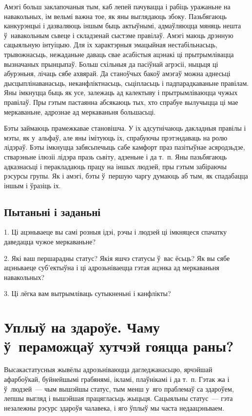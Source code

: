 Амэгі больш заклапочаныя тым, каб лепей пачувацца і рабіць уражаньне на навакольных, ім вельмі важна тое, як яны выглядаюць збоку. Пазьбягаюць канкурэнцыі і дазваляюць іншым быць актыўнымі, адмаўляюцца мяняць нешта ў~навакольным сьвеце і складзенай сыстэме правілаў. Амэгі маюць дрэнную сацыяльную інтуіцыю. Для іх характэрныя эмацыйная нестабільнасьць, трывожнасьць, нежаданьне даваць свае асабістыя ацэнакі ці прытрымлівацца вызначаных прынцыпаў. Больш схільныя да пасіўнай агрэсіі, ныцьця ці абурэньня, лічаць сябе ахвярай. Да станоўчых бакоў амэгаў можна аднесьці дысцыплінаванасьць, неканфліктнасьць, сьціпласьць і падпарадкаваньне правілам. Яны імкнуцца быць як усе, залежаць ад калектыву і прытрымліваюцца чужых правілаў. Пры гэтым пастаянна абсякаюць тых, хто спрабуе вылучыцца ці мае меркаваньне, адрознае ад меркаваньня большасьці.

Бэты займаюць прамежкавае становішча. У іх адсутнічаюць дакладныя правілы і мэты, як у~альфаў, але яны імітуюць іх, спрабуючы прэтэндаваць на ролю лідэраў. Бэты імкнуцца забясьпечыць сабе камфорт праз пазітыўнае асяродзьдзе, стварэньне ілюзіі лідэра празь сьвіту, адзеньне і да т.~п. Яны пазьбягаюць адказнасьці і перакладаюць працу на іншых людзей, пры гэтым забіраючы рэсурсы групы. Як і амэгі, бэты ў~першую чаргу думаюць аб тым, як спадабацца іншым і ўразіць іх.

\subsection*{Пытаньні і заданьні}

1. Ці ацэньваеце вы самі розныя ідэі, рэчы і людзей ці імкняцеся спачатку даведацца чужое меркаваньне?

2. Які ваш першарадны статус? Якія яшчэ статусы ў~вас ёсьць? Як вы сябе ацэньваеце суб'ектыўна і ці адрозьніваецца гэтая ацэнка ад меркаваньня навакольных?

3. Ці лёгка вам вытрымліваць сутыкненьні і канфлікты?


\section{Уплыў на здароўе. Чаму ў~пераможцаў хутчэй гояцца раны?}

Высакастатусныя жывёлы адрозьніваюцца дагледжанасьцю, ярчэйшай афарбоўкай, буйнейшымі грабянямі, ікламі, плаўнікамі і да т.~п. Гэтак жа і ў~людзей~--- чым вышэйшы статус, тым менш у~яго праблемаў са здароўем, лепшы выгляд і вышэйшая працягласьць жыцьця. Сацыяльны статус~--- гэта незалежны рэсурс здароўя чалавека, і яго ўплыў мы часта недаацэньваем. 

